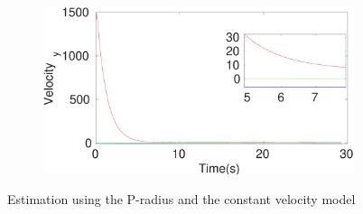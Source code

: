 \begin{figure}[h]
\begin{subfigure}{.5\linewidth}
\end{subfigure}
\begin{subfigure}{.5\linewidth}
\centering
\includegraphics[width=\linewidth]{figures/Prad/s3cvpradVelocity_y}
\end{subfigure}
\caption{Estimation using the P-radius and the constant velocity model}
\end{figure}

